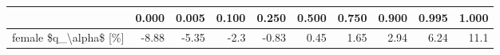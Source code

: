 \begin{tabular}{lrrrrrrrrr}
\toprule
{} &  0.000 &  0.005 &  0.100 &  0.250 &  0.500 &  0.750 &  0.900 &  0.995 &  1.000 \\
\midrule
female \$q\_\textbackslash alpha\$ [\%] &  -8.88 &  -5.35 &   -2.3 &  -0.83 &   0.45 &   1.65 &   2.94 &   6.24 &   11.1 \\
\bottomrule
\end{tabular}

